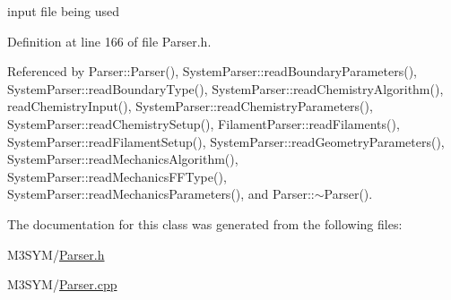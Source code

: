 input file being used 



Definition at line 166 of file Parser.\+h.



Referenced by Parser\+::\+Parser(), System\+Parser\+::read\+Boundary\+Parameters(), System\+Parser\+::read\+Boundary\+Type(), System\+Parser\+::read\+Chemistry\+Algorithm(), read\+Chemistry\+Input(), System\+Parser\+::read\+Chemistry\+Parameters(), System\+Parser\+::read\+Chemistry\+Setup(), Filament\+Parser\+::read\+Filaments(), System\+Parser\+::read\+Filament\+Setup(), System\+Parser\+::read\+Geometry\+Parameters(), System\+Parser\+::read\+Mechanics\+Algorithm(), System\+Parser\+::read\+Mechanics\+F\+F\+Type(), System\+Parser\+::read\+Mechanics\+Parameters(), and Parser\+::$\sim$\+Parser().



The documentation for this class was generated from the following files\+:\begin{DoxyCompactItemize}
\item 
M3\+S\+Y\+M/\hyperlink{Parser_8h}{Parser.\+h}\item 
M3\+S\+Y\+M/\hyperlink{Parser_8cpp}{Parser.\+cpp}\end{DoxyCompactItemize}
